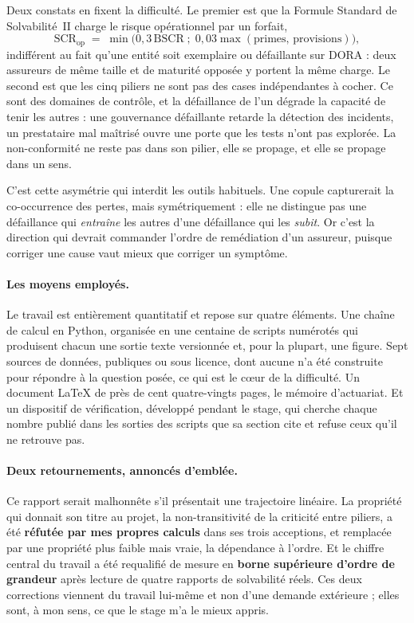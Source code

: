 \documentclass[12pt,a4paper]{article}
\theoremstyle{definition}
\begin{document}
Deux constats en fixent la difficulté. Le premier est que la Formule Standard de
Solvabilité~II charge le risque opérationnel par un forfait,
\[
  \mathrm{SCR}_{\text{op}} \;=\; \min\bigl(0{,}3\,\mathrm{BSCR}\;;\;
  0{,}03\max(\text{primes},\,\text{provisions})\bigr),
\]
indifférent au fait qu'une entité soit exemplaire ou défaillante sur DORA : deux
assureurs de même taille et de maturité opposée y portent la même charge. Le
second est que les cinq piliers ne sont pas des cases indépendantes à cocher. Ce
sont des domaines de contrôle, et la défaillance de l'un dégrade la capacité de
tenir les autres : une gouvernance défaillante retarde la détection des
incidents, un prestataire mal maîtrisé ouvre une porte que les tests n'ont pas
explorée. La non-conformité ne reste pas dans son pilier, elle se propage, et elle
se propage dans un sens.

C'est cette asymétrie qui interdit les outils habituels. Une copule capturerait la
co-occurrence des pertes, mais symétriquement : elle ne distingue pas une
défaillance qui \emph{entraîne} les autres d'une défaillance qui les \emph{subit}.
Or c'est la direction qui devrait commander l'ordre de remédiation d'un assureur,
puisque corriger une cause vaut mieux que corriger un symptôme.

\paragraph{Les moyens employés.} Le travail est entièrement quantitatif et repose
sur quatre éléments. Une chaîne de calcul en Python, organisée en une centaine de
scripts numérotés qui produisent chacun une sortie texte versionnée et, pour la
plupart, une figure. Sept sources de données, publiques ou sous licence, dont
aucune n'a été construite pour répondre à la question posée, ce qui est le c\oe{}ur de
la difficulté. Un document \LaTeX{} de près de cent quatre-vingts pages, le
mémoire d'actuariat. Et un dispositif de vérification, développé pendant le stage,
qui cherche chaque nombre publié dans les sorties des scripts que sa section cite
et refuse ceux qu'il ne retrouve pas.

\paragraph{Deux retournements, annoncés d'emblée.} Ce rapport serait malhonnête
s'il présentait une trajectoire linéaire. La propriété qui donnait son titre au
projet, la non-transitivité de la criticité entre piliers, a été \textbf{réfutée
par mes propres calculs} dans ses trois acceptions, et remplacée par une propriété
plus faible mais vraie, la dépendance à l'ordre. Et le chiffre central du travail
a été requalifié de mesure en \textbf{borne supérieure d'ordre de grandeur} après
lecture de quatre rapports de solvabilité réels. Ces deux corrections viennent du
travail lui-même et non d'une demande extérieure ; elles sont, à mon sens, ce que
le stage m'a le mieux appris.
\end{document}
